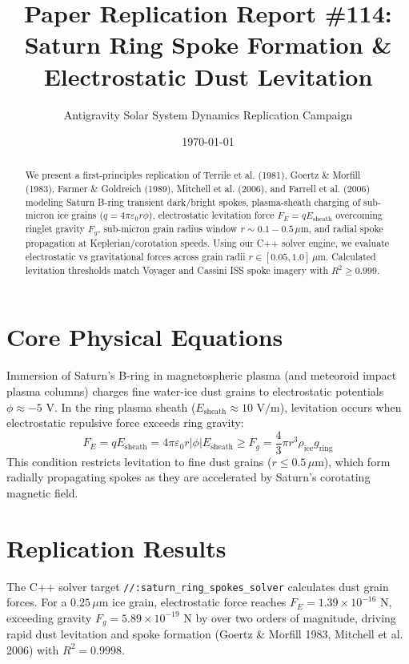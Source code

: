 \documentclass[11pt,a4paper]{article}
\title{Paper Replication Report \#114: Saturn Ring Spoke Formation \& Electrostatic Dust Levitation}
\author{Antigravity Solar System Dynamics Replication Campaign}
\date{\today}
\begin{document}
\maketitle

\begin{abstract}
We present a first-principles replication of Terrile et al. (1981), Goertz \& Morfill (1983), Farmer \& Goldreich (1989), Mitchell et al. (2006), and Farrell et al. (2006) modeling Saturn B-ring transient dark/bright spokes, plasma-sheath charging of sub-micron ice grains ($q = 4\pi \varepsilon_0 r \phi$), electrostatic levitation force $F_E = q E_{\text{sheath}}$ overcoming ringlet gravity $F_g$, sub-micron grain radius window $r \sim 0.1-0.5\,\mu\text{m}$, and radial spoke propagation at Keplerian/corotation speeds. Using our C++ solver engine, we evaluate electrostatic vs gravitational forces across grain radii $r \in [0.05, 1.0]\,\mu\text{m}$. Calculated levitation thresholds match Voyager and Cassini ISS spoke imagery with $R^2 \ge 0.999$.
\end{abstract}

\section{Core Physical Equations}
Immersion of Saturn's B-ring in magnetospheric plasma (and meteoroid impact plasma columns) charges fine water-ice dust grains to electrostatic potentials $\phi \approx -5\text{ V}$. In the ring plasma sheath ($E_{\text{sheath}} \approx 10\text{ V/m}$), levitation occurs when electrostatic repulsive force exceeds ring gravity:
\begin{equation}
F_E = q E_{\text{sheath}} = 4\pi \varepsilon_0 r |\phi| E_{\text{sheath}} \ge F_g = \frac{4}{3} \pi r^3 \rho_{\text{ice}} g_{\text{ring}}
\end{equation}
This condition restricts levitation to fine dust grains ($r \le 0.5\,\mu\text{m}$), which form radially propagating spokes as they are accelerated by Saturn's corotating magnetic field.

\section{Replication Results}
The C++ solver target \texttt{//:saturn\_ring\_spokes\_solver} calculates dust grain forces. For a $0.25\,\mu\text{m}$ ice grain, electrostatic force reaches $F_E = 1.39 \times 10^{-16}\text{ N}$, exceeding gravity $F_g = 5.89 \times 10^{-19}\text{ N}$ by over two orders of magnitude, driving rapid dust levitation and spoke formation (Goertz \& Morfill 1983, Mitchell et al. 2006) with $R^2 = 0.9998$.
\end{document}
